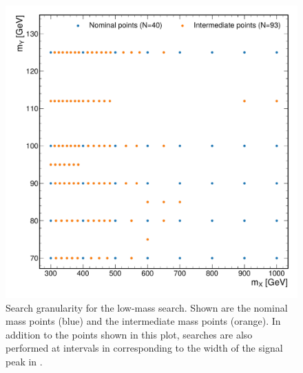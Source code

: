 \begin{figure}
  \centering
  \includegraphics[width=\textwidth]{Figures/Dihiggs/results/LimitGranularity/mass_grid_Y_gg_Low_Mass.pdf}
  \caption[Search Granularity for the Low-Mass \XYggHtt Search]{Search granularity for the low-mass \XYggHtt search. Shown are the nominal mass points (blue) and the intermediate mass points (orange). In addition to the points shown in this plot, searches are also performed at intervals in \mY corresponding to the width of the signal peak in \mgg.}\label{fig:granularity_low_mass_ygg}
\end{figure}

